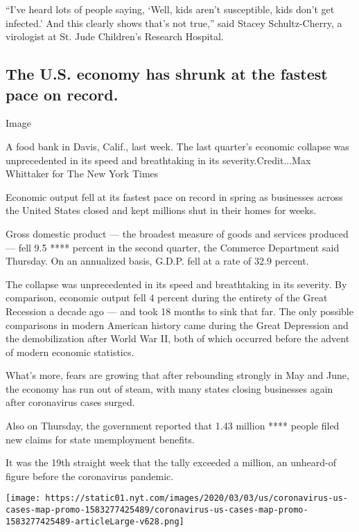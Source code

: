 ``I've heard lots of people saying, `Well, kids aren't susceptible, kids
don't get infected.' And this clearly shows that's not true,'' said
Stacey Schultz-Cherry, a virologist at St. Jude Children's Research
Hospital.

\hypertarget{the-us-economy-has-shrunk-at-the-fastest-pace-on-record}{%
\subsection{The U.S. economy has shrunk at the fastest pace on
record.}\label{the-us-economy-has-shrunk-at-the-fastest-pace-on-record}}

Image

A food bank in Davis, Calif., last week. The last quarter's economic
collapse was unprecedented in its speed and breathtaking in its
severity.Credit...Max Whittaker for The New York Times

Economic output fell at its fastest pace on record in spring as
businesses across the United States closed and kept millions shut in
their homes for weeks.

Gross domestic product --- the broadest measure of goods and services
produced --- fell 9.5 **** percent in the second quarter, the Commerce
Department said Thursday. On an annualized basis, G.D.P. fell at a rate
of 32.9 percent.

The collapse was unprecedented in its speed and breathtaking in its
severity. By comparison, economic output fell 4 percent during the
entirety of the Great Recession a decade ago --- and took 18 months to
sink that far. The only possible comparisons in modern American history
came during the Great Depression and the demobilization after World War
II, both of which occurred before the advent of modern economic
statistics.

What's more, fears are growing that after rebounding strongly in May and
June, the economy has run out of steam, with many states closing
businesses again after coronavirus cases surged.

Also on Thursday, the government reported that 1.43 million **** people
filed new claims for state unemployment benefits.

It was the 19th straight week that the tally exceeded a million, an
unheard-of figure before the coronavirus pandemic.

\href{https://www.nytimes.com/interactive/2020/us/coronavirus-us-cases.html}{}

\texttt{[image: https://static01.nyt.com/images/2020/03/03/us/coronavirus-us-cases-map-promo-1583277425489/coronavirus-us-cases-map-promo-1583277425489-articleLarge-v628.png]}

